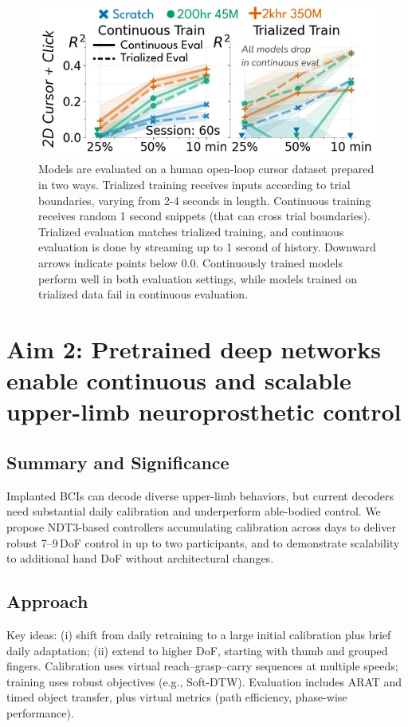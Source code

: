 \documentclass[12pt,oneside]{report}
\begin{document}
\begin{figure}[h]
  \centering
  \includegraphics[width=0.5\linewidth]{ch2_trialized.png}
  \caption{Models are evaluated on a human open-loop cursor dataset prepared in two ways. Trialized training receives inputs according to trial boundaries, varying from 2-4 seconds in length. Continuous training receives random 1 second snippets (that can cross trial boundaries). Trialized evaluation matches trialized training, and continuous evaluation is done by streaming up to 1 second of history. Downward arrows indicate points below 0.0. Continuously trained models perform well in both evaluation settings, while models trained on trialized data fail in continuous evaluation.}
  \label{fig:trialized}
\end{figure}

\chapter{Aim 2: Pretrained deep networks enable continuous and scalable upper-limb neuroprosthetic control}

\section{Summary and Significance}
Implanted BCIs can decode diverse upper-limb behaviors, but current decoders need substantial daily calibration and underperform able-bodied control. We propose NDT3-based controllers accumulating calibration across days to deliver robust 7--9\,DoF control in up to two participants, and to demonstrate scalability to additional hand DoF without architectural changes.

\section{Approach}
Key ideas: (i) shift from daily retraining to a large initial calibration plus brief daily adaptation; (ii) extend to higher DoF, starting with thumb and grouped fingers. Calibration uses virtual reach--grasp--carry sequences at multiple speeds; training uses robust objectives (e.g., Soft-DTW). Evaluation includes ARAT and timed object transfer, plus virtual metrics (path efficiency, phase-wise performance).
\end{document}
